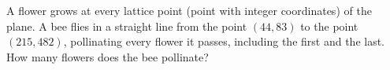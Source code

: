 A flower grows at every lattice point (point with integer coordinates) of the plane. A bee flies in a straight line from the point $(44,83)$ to the point $(215,482)$, pollinating every flower it passes, including the first and the last. How many flowers does the bee pollinate?
